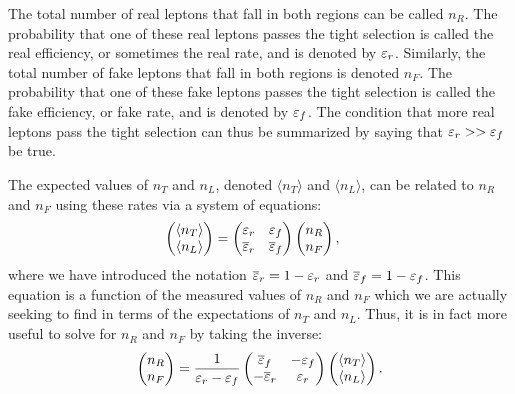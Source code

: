 The total number of real leptons that fall in 
both regions can be called $n_R$. The probability that one of these
real leptons passes the tight selection is called the 
real efficiency, or sometimes the real rate, and is denoted by 
$\varepsilon_r$. Similarly, the total number of fake leptons 
that fall in both regions is denoted $n_F$. The probability 
that one of these fake leptons passes the tight selection is 
called the fake efficiency, or fake rate, and is 
denoted by $\varepsilon_f$. The condition that
more real leptons pass the tight selection can thus be summarized by saying
that $\varepsilon_r>>\varepsilon_f$ be true.

The expected values
of  $n_T$ and $n_L$,
denoted $\langle n_T\rangle$ and $\langle n_L\rangle$,
can be related to $n_R$ and $n_F$ using these rates via a system of
equations:
\begin{align}
  \label{eq:mxm_single}
  \begin{pmatrix} \langle n_T\rangle \\ \langle n_L\rangle \end{pmatrix} 
  &= 
  \begin{pmatrix}
  \varepsilon_r & \varepsilon_f \\ \overline{\varepsilon}_r & \overline{\varepsilon}_f
  \end{pmatrix} 
  \begin{pmatrix} n_R \\ n_F \end{pmatrix},
\end{align}
where we have introduced the notation $\overline{\varepsilon}_r = 1-\varepsilon_r$
and $\overline{\varepsilon}_f =1-\varepsilon_f$.
This equation is a function of the measured values of
$n_R$ and $n_F$ which we are actually seeking to find in terms of the 
expectations of $n_T$ and $n_L$. Thus, it is in fact more
useful to solve for $n_R$ and $n_F$ by taking the inverse:
\begin{equation}
  \label{eq:mxm_single_inverted}
  \begin{pmatrix} n_R \\ n_F \end{pmatrix} 
  =
  \frac{1}{\varepsilon_r-\varepsilon_f}
  \begin{pmatrix}
  \overline{\varepsilon}_f & -\varepsilon_f \\ -\overline{\varepsilon}_r & \varepsilon_r
  \end{pmatrix} 
  \begin{pmatrix} \langle n_T\rangle \\ \langle n_L\rangle \end{pmatrix}.
\end{equation}

